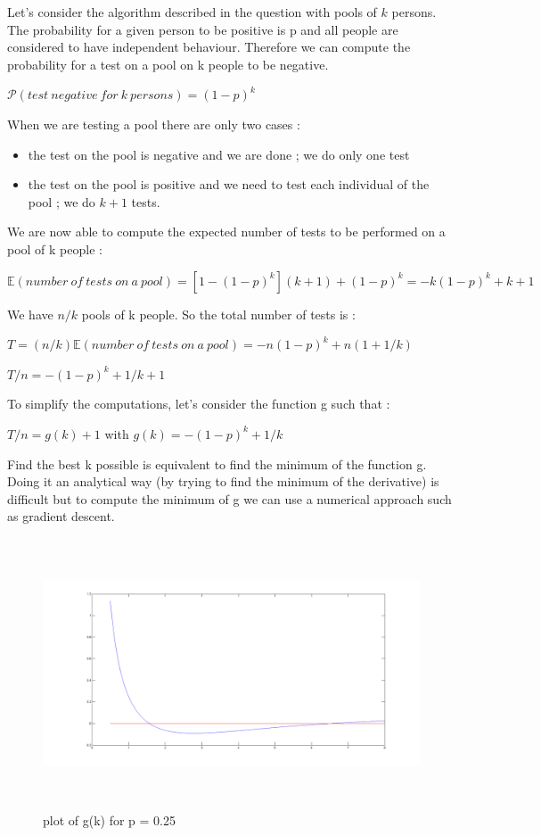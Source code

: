Let's consider the algorithm described in the question with pools of $k$ persons. The probability for a given person to be positive is p and all people are considered to have independent behaviour. Therefore we can compute the probability for a test on a pool on k people to be negative.

$\mathcal{P}(test\ negative\ for\ k\ persons) = (1-p)^{k}$

When we are testing a pool there are only two cases :
\begin{itemize}
	\item the test on the pool is negative and we are done ; we do only one test
	\item the test on the pool is positive and we need to test each individual of the pool ; we do $k+1$ tests.
\end{itemize}

We are now able to compute the expected number of tests to be performed on a pool of k people :

$\mathbb{E}(number\ of\ tests\ on\ a\ pool) = [1-(1-p)^{k}](k+1)+(1-p)^{k} = -k(1-p)^{k}+k+1$

We have $n/k$ pools of k people. So the total number of tests is :

$T = (n/k) \mathbb{E}(number\ of\ tests\ on\ a\ pool) = -n(1-p)^{k} + n(1+1/k)$

$T/n = -(1-p)^{k} + 1/k+1$

To simplify the computations, let's consider the function g such that :

$T/n = g(k) + 1$ with $g(k) = -(1-p)^{k}+1/k$

Find the best k possible is equivalent to find the minimum of the function g. Doing it an analytical way (by trying to find the minimum of the derivative) is difficult but to compute the minimum of g we can use a numerical approach such as gradient descent.

\begin{figure}[H]
\begin{center}
   \includegraphics[height=8cm]{fig5.png}
	\caption{plot of g(k) for p = 0.25}
	\label{plot}
	\end{center}
\end{figure}

